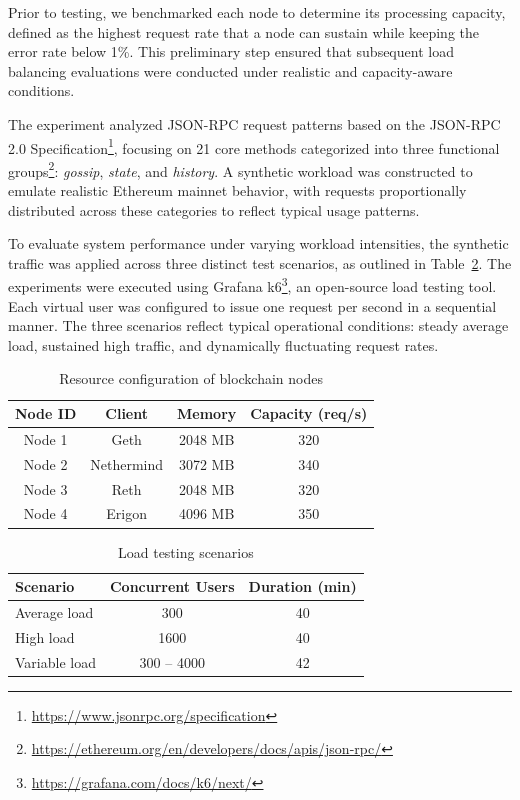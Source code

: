 \documentclass[lnbip]{svmultln}
\begin{document}
Prior to testing, we benchmarked each node to determine its processing capacity, defined as the highest request rate that a node can sustain while keeping the error rate below 1\%. This preliminary step ensured that subsequent load balancing evaluations were conducted under realistic and capacity-aware conditions.

The experiment analyzed JSON-RPC request patterns based on the JSON-RPC 2.0 Specification\footnote{\url{https://www.jsonrpc.org/specification}}, focusing on 21 core methods categorized into three functional groups\footnote{\url{https://ethereum.org/en/developers/docs/apis/json-rpc/}}: \textit{gossip}, \textit{state}, and \textit{history}. A synthetic workload was constructed to emulate realistic Ethereum mainnet behavior, with requests proportionally distributed across these categories to reflect typical usage patterns.

To evaluate system performance under varying workload intensities, the synthetic traffic was applied across three distinct test scenarios, as outlined in Table~\ref{t:es_1}. The experiments were executed using Grafana k6\footnote{\url{https://grafana.com/docs/k6/next/}}, an open-source load testing tool. Each virtual user was configured to issue one request per second in a sequential manner. The three scenarios reflect typical operational conditions: steady average load, sustained high traffic, and dynamically fluctuating request rates.

\begin{table}[htbp]
\caption{Resource configuration of blockchain nodes}
\begin{center}
    \begin{tabular}{|c|c|c|c|}
        \hline
        \textbf{Node ID} & \textbf{Client} & \textbf{Memory} & \textbf{Capacity (req/s)} \\
        \hline
        Node 1 & Geth       & 2048 MB & 320 \\
        Node 2 & Nethermind & 3072 MB & 340 \\
        Node 3 & Reth       & 2048 MB & 320 \\
        Node 4 & Erigon     & 4096 MB & 350 \\
        \hline
    \end{tabular}
    \label{t:es_2}
\end{center}
\end{table}

\begin{table}[htbp]
\caption{Load testing scenarios}
\begin{center}
    \begin{tabular}{|l|c|c|}
        \hline
        \textbf{Scenario} & \textbf{Concurrent Users} & \textbf{Duration (min)} \\
        \hline
        Average load   & 300           & 40 \\
        High load      & 1600          & 40 \\
        Variable load  & 300 -- 4000   & 42 \\
        \hline
    \end{tabular}
    \label{t:es_1}
\end{center}
\end{table}
\end{document}
